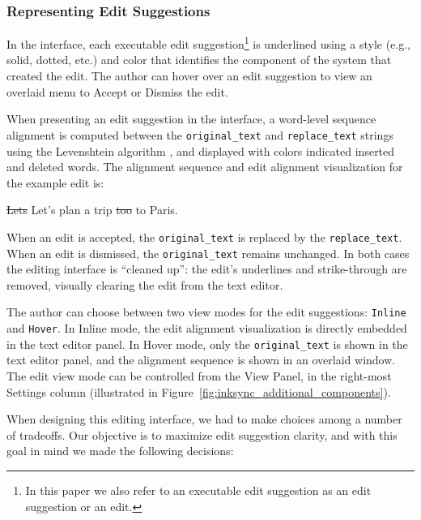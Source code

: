 \documentclass[manuscript]{acmart}
\newenvironment{myjsonblock}[1]{%
    \begin{center}
    \begin{minipage}{0.5\textwidth}
    \begin{mdframed}[
        linecolor=black,
        linewidth=1pt,
        innertopmargin=6pt,
        innerbottommargin=6pt,
        innerrightmargin=10pt,
        innerleftmargin=10pt,
        frametitle=#1,
        frametitlebackgroundcolor=slackbrown, %
        frametitlefont=\color{white}\bfseries, %
    ]
}{%
    \end{mdframed}
    \end{minipage}
    \end{center}
}
\begin{document}
\subsubsection{Representing Edit Suggestions} \label{sec:rep_edit_suggestions}

In the interface, each executable edit suggestion\footnote{In this paper we also refer to an executable edit suggestion as an edit suggestion or an edit.} is underlined using a style (e.g., solid, dotted, etc.) and color that identifies the component of the system that created the edit. The author can hover over an edit suggestion to view an overlaid menu to Accept or Dismiss the edit.

When presenting an edit suggestion in the interface, a word-level sequence alignment is computed between the \texttt{original\_text} and \texttt{replace\_text} strings using the Levenshtein algorithm \cite{Levenshtein1966BinaryCC}, and displayed with colors indicated \textcolor{colorins}{inserted} and \textcolor{colordel}{deleted} words. The alignment sequence and edit alignment visualization for the example edit is:

\begin{myjsonblock}{Edit Alignment Visualization}
    \textcolor{colordel}{\sout{Lets}} \textcolor{colorins}{Let's} plan a trip \textcolor{colordel}{\sout{too}} \textcolor{colorins}{to} Paris.
\end{myjsonblock}

When an edit is accepted, the \texttt{original\_text} is replaced by the \texttt{replace\_text}. When an edit is dismissed, the \texttt{original\_text} remains unchanged. In both cases the editing interface is ``cleaned up'': the edit's underlines and strike-through are removed, visually clearing the edit from the text editor.

The author can choose between two view modes for the edit suggestions: \texttt{Inline} and \texttt{Hover}. In Inline mode, the edit alignment visualization is directly embedded in the text editor panel. In Hover mode, only the \texttt{original\_text} is shown in the text editor panel, and the alignment sequence is shown in an overlaid window.
The edit view mode can be controlled from the View Panel, in the right-most Settings column (illustrated in Figure~\ref{fig:inksync_additional_components}).

When designing this editing interface, we had to make choices among a number of tradeoffs. Our objective is to maximize edit suggestion clarity, and with this goal in mind we made the following decisions:
\end{document}
